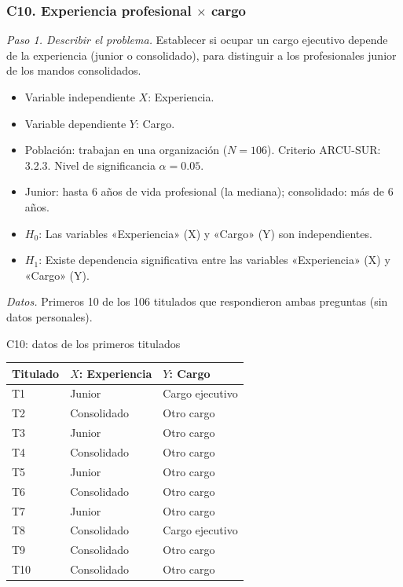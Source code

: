 \subsubsection*{C10. Experiencia profesional $\times$ cargo}

\textit{Paso 1. Describir el problema.} Establecer si ocupar un cargo ejecutivo depende de la experiencia (junior o consolidado), para distinguir a los profesionales junior de los mandos consolidados.

\begin{itemize}[nosep]
  \item Variable independiente $X$: Experiencia.
  \item Variable dependiente $Y$: Cargo.
  \item Población: trabajan en una organización ($N = 106$). Criterio ARCU-SUR: 3.2.3. Nivel de significancia $\alpha = 0.05$.
  \item Junior: hasta 6 años de vida profesional (la mediana); consolidado: más de 6 años.
  \item $H_0$: Las variables «Experiencia» (X) y «Cargo» (Y) son independientes.
  \item $H_1$: Existe dependencia significativa entre las variables «Experiencia» (X) y «Cargo» (Y).
\end{itemize}

\textit{Datos.} Primeros 10 de los 106 titulados que respondieron ambas preguntas (sin datos personales).

\begin{mitabla}{C10: datos de los primeros titulados}
\begin{tabular}{lll}
\toprule
Titulado & $X$: Experiencia & $Y$: Cargo \\
\midrule
T1 & Junior & Cargo ejecutivo \\
T2 & Consolidado & Otro cargo \\
T3 & Junior & Otro cargo \\
T4 & Consolidado & Otro cargo \\
T5 & Junior & Otro cargo \\
T6 & Consolidado & Otro cargo \\
T7 & Junior & Otro cargo \\
T8 & Consolidado & Cargo ejecutivo \\
T9 & Consolidado & Otro cargo \\
T10 & Consolidado & Otro cargo \\
\bottomrule
\end{tabular}
\end{mitabla}

